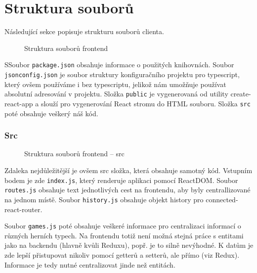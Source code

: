 \documentclass[a4paper,oneside,12pt]{report}
\begin{document}
\section{Struktura souborů}

Následující sekce popisuje strukturu souborů clienta.

\begin{figure}[H]
   \caption[Struktura souborů frontendu]{Struktura souborů frontend}
   \label{fig:frontendStructure}
\end{figure}

SSoubor \texttt{package.json} obsahuje informace o použitých knihovnách. Soubor \texttt{jsonconfig.json} je soubor struktury konfiguračního projektu pro typescript, který ovšem používáme i bez typescriptu, jelikož nám umožňuje používat absolutní adresování v projektu. Složka \texttt{public} je vygenerovaná od utility create-react-app a slouží pro vygenerování React stromu do HTML souboru. Složka \texttt{src} poté obsahuje veškerý náš kód.

\subsubsection{Src}
\begin{figure}[H]
   \caption[Struktura souborů frontendu -- src]{Struktura souborů frontend -- src}
   \label{fig:frontendStructureSrc}
\end{figure}
Zdaleka nejdůležitější je ovšem src složka, která obsahuje samotný kód.
Vstupním bodem je zde \texttt{index.js}, který renderuje aplikaci pomocí ReactDOM. Soubor \texttt{routes.js} obsahuje text jednotlivých cest na frontendu, aby byly centrallizované na jednom místě. Soubor \texttt{history.js} obsahuje objekt history pro connected-react-router. 

Soubor \texttt{games.js} poté obsahuje veškeré informace pro centralizaci informací o různých herních typech. Na frontendu totiž není možná stejná práce s entitami jako na backendu (hlavně kvůli Reduxu), popř. je to silně nevýhodné. K datům je zde lepší přistupovat nikoliv pomocí getterů a setterů, ale přímo (viz Redux). Informace je tedy nutné centralizovat jinde než entitách.
\end{document}
